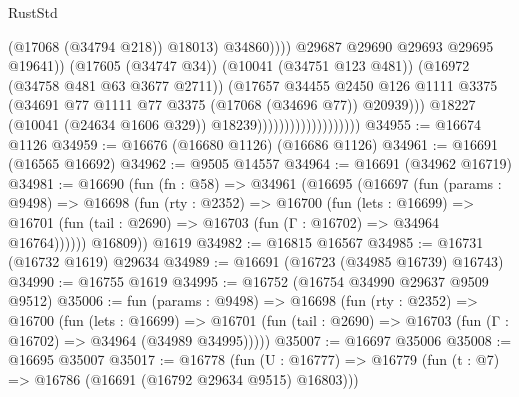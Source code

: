 \begin{lexlean}{RustStd}
\begin{coremodule}
                                                          (@17068 (@34794 @218))
                                                          @18013)
                                                        @34860))))
                                                @29687
                                                @29690
                                                @29693
                                                @29695
                                                @19641))
                                            (@17605 (@34747 @34))
                                            (@10041 (@34751 @123 @481))
                                            (@16972 (@34758 @481 @63 @3677 @2711))
                                            (@17657
                                              @34455
                                              @2450
                                              @126
                                              @1111
                                              @3375
                                              (@34691
                                                @77
                                                @1111
                                                @77
                                                @3375
                                                (@17068 (@34696 @77))
                                                @20939)))
                                          @18227
                                          (@10041 (@24634 @1606 @329))
                                          @18239)))))))))))))))))))
@34955 := @16674 @1126
@34959 := @16676 (@16680 @1126) (@16686 @1126)
@34961 := @16691 (@16565 @16692)
@34962 := @9505 @14557
@34964 := @16691 (@34962 @16719)
@34981 := @16690
    (fun (fn : @58) =>
    @34961
      (@16695
        (@16697
          (fun (params : @9498) =>
          @16698
            (fun (rty : @2352) =>
            @16700
              (fun (lets : @16699) =>
              @16701 (fun (tail : @2690) => @16703 (fun (Γ : @16702) => @34964 @16764))))))
        @16809))
    @1619
@34982 := @16815 @16567
@34985 := @16731 (@16732 @1619) @29634
@34989 := @16691 (@16723 (@34985 @16739) @16743)
@34990 := @16755 @1619
@34995 := @16752 (@16754 @34990 @29637 @9509 @9512)
@35006 := fun (params : @9498) =>
  @16698
    (fun (rty : @2352) =>
    @16700
      (fun (lets : @16699) =>
      @16701 (fun (tail : @2690) => @16703 (fun (Γ : @16702) => @34964 (@34989 @34995)))))
@35007 := @16697 @35006
@35008 := @16695 @35007
@35017 := @16778
    (fun (U : @16777) => @16779 (fun (t : @7) => @16786 (@16691 (@16792 @29634 @9515) @16803)))

\end{coremodule}
\end{lexlean}
